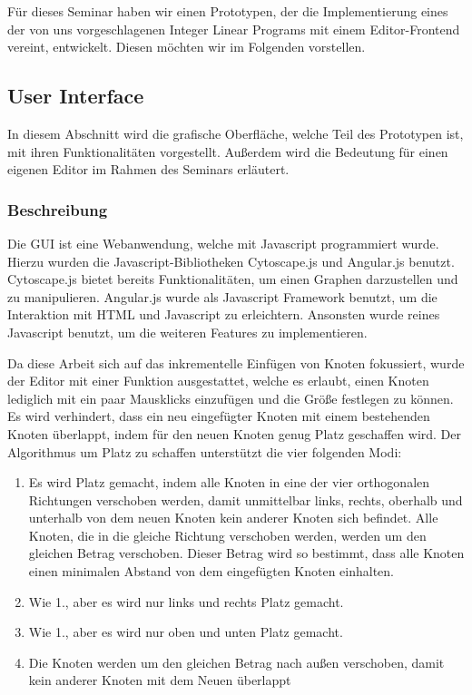 Für dieses Seminar haben wir einen Prototypen, der die Implementierung eines der von uns vorgeschlagenen Integer Linear Programs mit einem Editor-Frontend vereint, entwickelt. Diesen möchten wir im Folgenden vorstellen.

\subsection{User Interface}

In diesem Abschnitt wird die grafische Oberfläche, welche Teil des Prototypen ist, mit ihren
Funktionalitäten vorgestellt. Außerdem wird die Bedeutung für einen eigenen Editor im
Rahmen des Seminars erläutert.

\subsubsection{Beschreibung}

Die GUI ist eine Webanwendung, welche mit Javascript programmiert wurde. Hierzu wurden
die Javascript-Bibliotheken Cytoscape.js\cite{cytoscape} und Angular.js\cite{angularjs} benutzt. Cytoscape.js bietet bereits
Funktionalitäten, um einen Graphen darzustellen und zu manipulieren. Angular.js wurde als
Javascript Framework benutzt, um die Interaktion mit HTML und Javascript zu erleichtern.
Ansonsten wurde reines Javascript benutzt, um die weiteren Features zu implementieren.

Da diese Arbeit sich auf das inkrementelle Einfügen von Knoten fokussiert, wurde der Editor
mit einer Funktion ausgestattet, welche es erlaubt, einen Knoten lediglich mit ein paar
Mausklicks einzufügen und die Größe festlegen zu können. Es wird verhindert, dass ein neu
eingefügter Knoten mit einem bestehenden Knoten überlappt, indem für den neuen Knoten
genug Platz geschaffen wird. Der Algorithmus um Platz zu schaffen unterstützt die vier
folgenden Modi:

\begin{enumerate}
	\item Es wird Platz gemacht, indem alle Knoten in eine der vier orthogonalen Richtungen
verschoben werden, damit unmittelbar links, rechts, oberhalb und unterhalb von dem
neuen Knoten kein anderer Knoten sich befindet. Alle Knoten, die in die gleiche
Richtung verschoben werden, werden um den gleichen Betrag verschoben. Dieser
Betrag wird so bestimmt, dass alle Knoten einen minimalen Abstand von dem
eingefügten Knoten einhalten.
	\item Wie 1., aber es wird nur links und rechts Platz gemacht.
	\item Wie 1., aber es wird nur oben und unten Platz gemacht.
	\item Die Knoten werden um den gleichen Betrag nach außen verschoben, damit kein
anderer Knoten mit dem Neuen überlappt
\end{enumerate}

